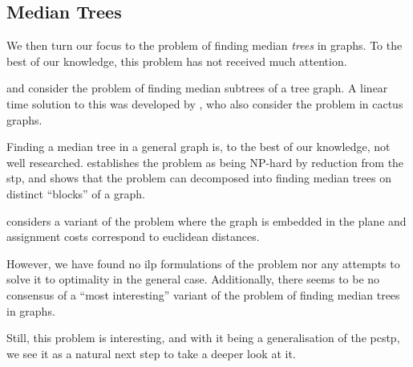  \subsection{Median Trees}\label{sec:related:mtp}
 We then turn our focus to the problem of finding median \textit{trees} in graphs.
  To the best of our knowledge, this problem has not received much attention.

  \citet{minieka1985optimal} and \citet{george2003bi} consider the problem of finding
  median subtrees of a tree graph.
  A linear time solution to this was developed by
  \citet{kim1991locating}, who also consider the problem in cactus graphs.

  Finding a median tree in a general graph is, to the best of our knowledge, not well researched.
 \citet{aneja1992location} establishes the
  problem as being NP-hard by reduction from the \gls{stp}, and shows that the problem can
  decomposed into finding median trees on distinct ``blocks'' of a graph.

  \citet{kim1991locating} considers a variant of the problem where the graph is embedded in the plane
  and assignment costs correspond to euclidean distances.
  
  However, we have found no \gls{ilp} formulations of the problem nor any attempts to solve it to optimality
  in the general case. Additionally, there seems to be no consensus of a ``most interesting'' variant
  of the problem of finding median trees in graphs.

  Still, this problem is interesting, and with it being a generalisation of the
  \gls{pcstp}, we see it as a natural next step to take a deeper look at it.


